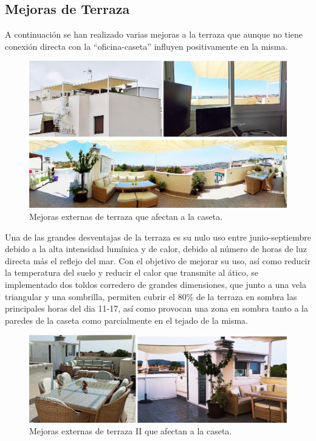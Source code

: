\subsection{Mejoras de Terraza}
A continuación se han realizado varias mejoras a la terraza que aunque no tiene conexión directa con la “oficina-caseta” influyen positivamente en la misma.

\begin{figure}[!htb]
\begin{center}
\includegraphics[width=1\textwidth]{./figuras/mejoras_terraza.jpg}
\caption{Mejoras externas de terraza que afectan a la caseta.}
\label{F:mejoras_terraza}
\end{center}
\end{figure}
Una de las grandes desventajas de la terraza es su nulo uso entre junio-septiembre debido a la alta intensidad lumínica y de calor, debido al número de horas de luz directa más el reflejo del mar. Con el objetivo de mejorar su uso, así como reducir la temperatura del suelo y reducir el calor que transmite al ático, se implementado dos toldos corredero de grandes dimensiones, que junto a una vela triangular y una sombrilla, permiten cubrir el 80\% de la terraza en sombra las principales horas del dia 11-17, así como provocan una zona en sombra tanto a la paredes de la caseta como parcialmente en el tejado de la misma.

\begin{figure}[!htb]
\begin{center}
\includegraphics[width=1\textwidth]{./figuras/mejoras_terraza_2.jpg}
\caption{Mejoras externas de terraza II que afectan a la caseta.}
\label{F:mejoras_terraza_2}
\end{center}
\end{figure}

